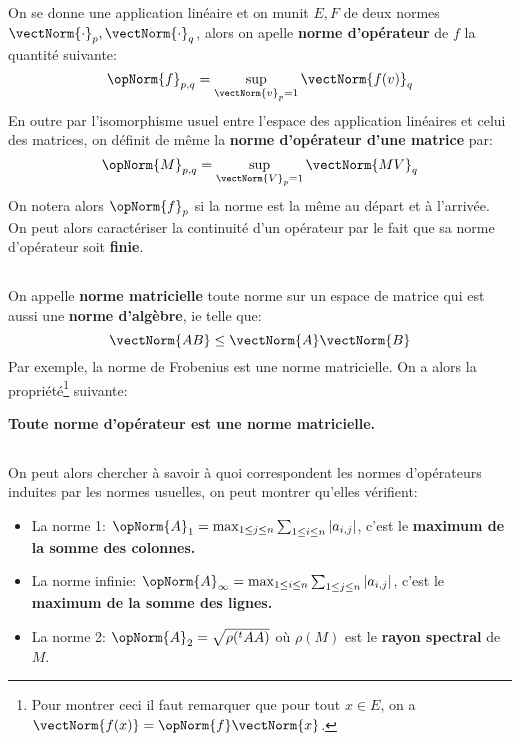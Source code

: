 \subsection*{}
On se donne une application linéaire et on munit \(E, F\) de deux normes \(\vectNorm{\cdot}_p, \vectNorm{\cdot}_q\), alors on apelle \textbf{norme d'opérateur} de \(f\) la quantité suivante:
\[
   \opNorm{f}_{p, q} = \sup_{\vectNorm{v}_p = 1} \vectNorm{f(v)}_q
\]
En outre par l'isomorphisme usuel entre l'espace des application linéaires et celui des matrices, on définit de même la \textbf{norme d'opérateur d'une matrice} par:
\[
   \opNorm{M}_{p, q} = \sup_{\vectNorm{V}_p = 1} \vectNorm{MV}_q
\]
On notera alors \(\opNorm{f}_{p}\) si la norme est la même au départ et à l'arrivée. On peut alors caractériser la continuité d'un opérateur par le fait que sa norme d'opérateur soit \textbf{finie}.


\subsection*{}
On appelle \textbf{norme matricielle} toute norme sur un espace de matrice qui est aussi une \textbf{norme d'algèbre}, ie telle que:
\[
   \vectNorm{AB} \leq \vectNorm{A}\vectNorm{B}
\]
Par exemple, la norme de Frobenius est une norme matricielle. On a alors la propriété\footnote[1]{Pour montrer ceci il faut remarquer que pour tout \(x \in E\), on a \(\vectNorm{f(x)} = \opNorm{f}\vectNorm{x}\).} suivante:
\begin{center}
   \textbf{Toute norme d'opérateur est une norme matricielle.}
\end{center}

\subsection*{}
On peut alors chercher à savoir à quoi correspondent les normes d'opérateurs induites par les normes usuelles, on peut montrer qu'elles vérifient:
\begin{itemize}
   \item La norme 1: \(\opNorm{A}_{1} = \max_{1 \leq j \leq n} \sum_{1 \leq i \leq n} |a_{i,j}|\), c'est le \textbf{maximum de la somme des colonnes.}
   \item La norme infinie: \(\opNorm{A}_{\infty} = \max_{1 \leq i \leq n} \sum_{1 \leq j \leq n} |a_{i,j}|\), c'est le \textbf{maximum de la somme des lignes.}
   \item La norme 2: \(\opNorm{A}_{2} = \sqrt{\rho({}^tAA)}\) où \(\rho(M)\) est le \textbf{rayon spectral} de \(M\).
\end{itemize}



